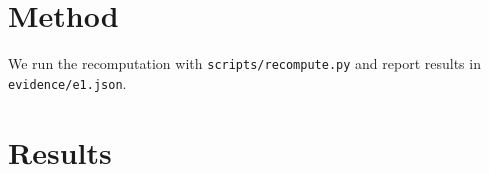 ﻿\section{Method}
We run the recomputation with \texttt{scripts/recompute.py} and report results in \texttt{evidence/e1.json}.
\section{Results}
\cite{chen2025mlrbench}
